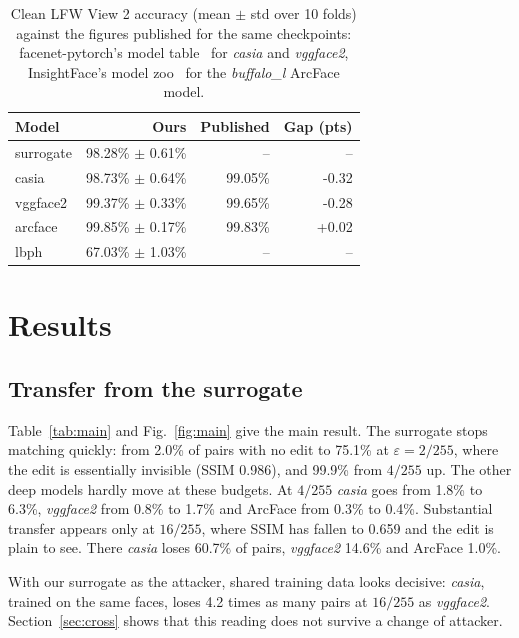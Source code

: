 \documentclass[conference]{IEEEtran}
\begin{document}
\begin{table}[tb]
\centering
\caption{Clean LFW View 2 accuracy (mean $\pm$ std over 10 folds) against the figures published for the same
checkpoints: facenet-pytorch's model table~\cite{facenetpytorch} for \emph{casia} and \emph{vggface2},
InsightFace's model zoo~\cite{insightface} for the \emph{buffalo\_l} ArcFace model.}
\label{tab:valid}
\footnotesize
\begin{tabular}{lrrr}
\toprule
Model & Ours & Published & Gap (pts) \\
\midrule
surrogate & 98.28\% $\pm$ 0.61\% & -- & -- \\
casia & 98.73\% $\pm$ 0.64\% & 99.05\% & -0.32 \\
vggface2 & 99.37\% $\pm$ 0.33\% & 99.65\% & -0.28 \\
arcface & 99.85\% $\pm$ 0.17\% & 99.83\% & +0.02 \\
lbph & 67.03\% $\pm$ 1.03\% & -- & -- \\
\bottomrule
\end{tabular}
\end{table}

\section{Results}
\subsection{Transfer from the surrogate}
Table~\ref{tab:main} and Fig.~\ref{fig:main} give the main result. The surrogate stops matching quickly: from
2.0\% of pairs with no edit to 75.1\% at $\varepsilon = 2/255$, where the edit is essentially invisible (SSIM
0.986), and 99.9\% from $4/255$ up. The other deep models hardly move at these budgets. At $4/255$ \emph{casia}
goes from 1.8\% to 6.3\%, \emph{vggface2} from 0.8\% to 1.7\% and ArcFace from 0.3\% to 0.4\%. Substantial
transfer appears only at $16/255$, where SSIM has fallen to 0.659 and the edit is plain to see. There
\emph{casia} loses 60.7\% of pairs, \emph{vggface2} 14.6\% and ArcFace 1.0\%.

With our surrogate as the attacker, shared training data looks decisive: \emph{casia}, trained on the same faces,
loses 4.2 times as many pairs at $16/255$ as \emph{vggface2}. Section~\ref{sec:cross} shows that this reading
does not survive a change of attacker.
\end{document}
